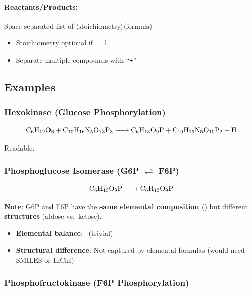 \paragraph{Reactants/Products:} Space-separated list of $\langle\text{stoichiometry}\rangle\langle\text{formula}\rangle$
\begin{itemize}
    \item Stoichiometry optional if = 1
    \item Separate multiple compounds with ``\texttt{+}''
\end{itemize}

\subsection{Examples}
\label{subsec:reaction-examples}

\subsubsection{Hexokinase (Glucose Phosphorylation)}

\begin{equation}
\ce{C6H12O6 + C10H16N5O13P3 -> C6H13O9P + C10H15N5O10P2 + H}
\end{equation}

\noindent Readable: 

\subsubsection{Phosphoglucose Isomerase (G6P $\rightleftharpoons$ F6P)}

\begin{equation}
\ce{C6H13O9P -> C6H13O9P}
\end{equation}

\noindent\textbf{Note}: G6P and F6P have the \textbf{same elemental composition} () but different \textbf{structures} (aldose vs.\ ketose).
\begin{itemize}
    \item \textbf{Elemental balance}:  \checkmark\ (trivial)
    \item \textbf{Structural difference}: Not captured by elemental formulas (would need SMILES or InChI)
\end{itemize}

\subsubsection{Phosphofructokinase (F6P Phosphorylation)}

